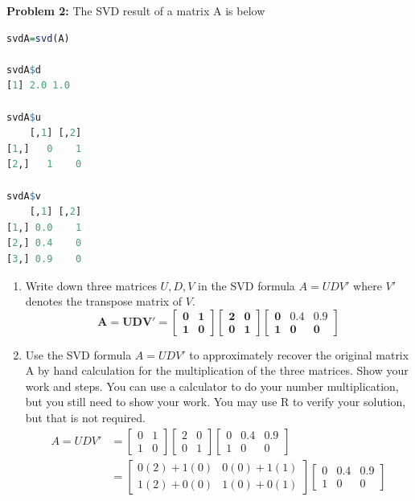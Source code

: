 \documentclass[11pt]{article}
\newenvironment{problem}[1]{\textbf{Problem #1: }}{\newpage}
\begin{document}
	\begin{problem}{2}
		The SVD result of a matrix A is below
\begin{lstlisting}[language = R]
svdA=svd(A)

svdA$d
[1] 2.0 1.0

svdA$u
    [,1] [,2]
[1,]   0    1
[2,]   1    0

svdA$v
    [,1] [,2]
[1,] 0.0    1
[2,] 0.4    0
[3,] 0.9    0
\end{lstlisting}
		\begin{enumerate}[label = (\alph*)]
			\item Write down three matrices $U, D, V$ in the SVD formula $A = UDV'$ where $V'$ denotes the transpose matrix of $V$.
			\[\boldsymbol{A = UDV' = \begin{bmatrix} 0 & 1 \\ 1 & 0 \end{bmatrix} \begin{bmatrix} 2 & 0 \\ 0 & 1\end{bmatrix} \begin{bmatrix} 0 & 0.4 & 0.9 \\ 1 & 0 & 0	\end{bmatrix}}\]
			\item Use the SVD formula $A = UDV'$ to approximately recover the original matrix A by hand calculation for the multiplication of the three matrices. Show your work and steps. You can use a calculator to do your number multiplication, but you still need to show your work. You may use R to verify your solution, but that is not required.
			\\
			\begin{align*}
				A = UDV' &= \begin{bmatrix} 0 & 1 \\ 1 & 0 \end{bmatrix} \begin{bmatrix} 2 & 0 \\ 0 & 1\end{bmatrix} \begin{bmatrix} 0 & 0.4 & 0.9 \\ 1 & 0 & 0	\end{bmatrix} \\
				&= \begin{bmatrix} 0(2) + 1(0) & 0(0) + 1(1) \\ 1(2) + 0(0) & 1(0) + 0(1)\end{bmatrix}\begin{bmatrix} 0 & 0.4 & 0.9 \\ 1 & 0 & 0	\end{bmatrix} \\

\end{align*}
\end{enumerate}
\end{problem}
\end{document}
